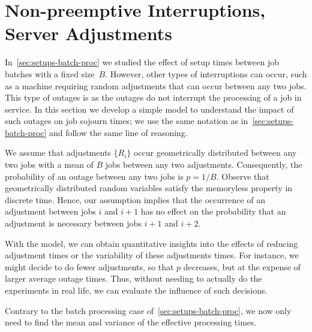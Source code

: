 \section{Non-preemptive Interruptions, Server Adjustments}
\label{sec:non-preempt-interr}





In~\cref{sec:setups-batch-proc} we studied the effect of setup times between job batches with a fixed size~$B$.
However, other types of interruptions can occur, such as a machine requiring random adjustments that can occur between any two jobs.
This type of outages is  as the outages do not interrupt the processing of a job in service.
In this section we develop a simple model to understand the impact of such outages on job sojourn times; we use the same notation as in~\cref{sec:setups-batch-proc} and follow the same line of reasoning.

We assume that adjustments $\{R_i\}$ occur geometrically distributed between any two jobs with a mean of $B$ jobs between any two adjustments.
Consequently, the probability of an outage between any two jobs is $p=1/B$.
Observe that geometrically distributed random variables satisfy the memoryless property in discrete time.
Hence, our assumption implies that the occurrence of an adjustment between jobs $i$ and $i+1$ has no effect on the probability that an adjustment is necessary between jobs $i+1$ and $i+2$.

With the model, we can obtain quantitative insights into the effects of reducing adjustment times or the variability of these adjustments times.
For instance, we might decide to do fewer adjustments, so that $p$ decreases, but at the expense of larger average outage times.
Thus, without needing to actually do the experiments in real life, we can evaluate the influence of such decisions.

Contrary to the batch processing case of~\cref{sec:setups-batch-proc}, we now only need to find the mean and variance of the effective processing times.

